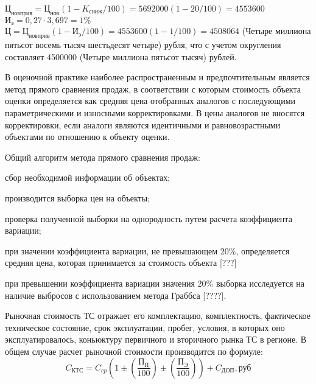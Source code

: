 \noindent $ \text{Ц}_\text{новприв} = \text{Ц}_\text{нов}(1-K_\text{сниж}/100)= 5692000(1-20/100) = 4553600  $\\
\noindent $ \text{И}_\text{э} = 0,27\cdot3,697 = 1 \%  $\\
$ \text{Ц} = \text{Ц}_\text{новприв}(1-\text{И}_\text{э}/100) = 4553600(1-1/100) = 4508064 $ (Четыре миллиона пятьсот восемь тысяч шестьдесят четыре) рубля, что с учетом округления составляет 4500000 (Четыре миллиона пятьсот  тысяч) рублей.






\par В оценочной практике наиболее распространенным и предпочтительным является метод прямого сравнения продаж, в соответствии с которым стоимость объекта оценки определяется как средняя цена отобранных аналогов с последующими параметрическими и износными корректировками.   В цены аналогов не вносятся корректировки, если аналоги являются идентичными и равновозрастными объектами по отношению к объекту оценки. 
\par Общий алгоритм метода прямого сравнения продаж:
\begin{list}{-}{}
	\item сбор необходимой информации об объектах;
	\item  производится выборка цен на объекты;
\item  проверка полученной выборки на однородность путем расчета коэффициента вариации;
\item  при значении коэффициента вариации, не превышающем 20\%, определяется средняя цена, которая принимается за стоимость объекта [???]
\item  при превышении коэффициента вариации значения  20\%  выборка исследуется на наличие выбросов с использованием метода Граббса [????].
\end{list}
Рыночная стоимость ТС отражает его комплектацию, комплектность, фактическое техническое состояние, срок эксплуатации, пробег, условия, в которых оно эксплуатировалось, коньюктуру первичного и вторичного рынка ТС в регионе. В общем случае расчет рыночной стоимости производится по формуле:
\begin{equation}\label{eq:aa}
C_{\text{КТС}} = C_{cp}\left(1 \pm  \left( \frac{\text{П}_{\text{П}}}{100}\right) \pm\left( \frac{\text{П}_{\text{Э}}}{100}\right) \right) + C_{\text{ДОП}}, \text{руб}
\end{equation}

